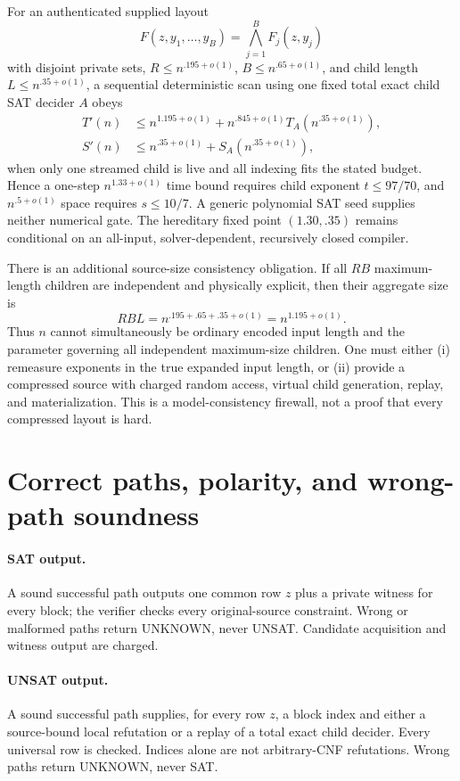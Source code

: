 \documentclass[11pt]{article}
\newcommand{\UNKNOWN}{\mathrm{UNKNOWN}}
\begin{document}
For an authenticated supplied layout
\[
 F(z,y_1,\ldots,y_B)=\bigwedge_{j=1}^B F_j(z,y_j)
\]
with disjoint private sets, $R\le n^{.195+o(1)}$, $B\le n^{.65+o(1)}$, and child length $L\le n^{.35+o(1)}$, a sequential deterministic scan using one fixed total exact child SAT decider $A$ obeys
\begin{align*}
 T'(n)&\le n^{1.195+o(1)}+n^{.845+o(1)}T_A(n^{.35+o(1)}),\\
 S'(n)&\le n^{.35+o(1)}+S_A(n^{.35+o(1)}),
\end{align*}
when only one streamed child is live and all indexing fits the stated budget.  Hence a one-step $n^{1.33+o(1)}$ time bound requires child exponent $t\le97/70$, and $n^{.5+o(1)}$ space requires $s\le10/7$.  A generic polynomial SAT seed supplies neither numerical gate.  The hereditary fixed point $(1.30,.35)$ remains conditional on an all-input, solver-dependent, recursively closed compiler.

There is an additional source-size consistency obligation.  If all $RB$ maximum-length children are independent and physically explicit, then their aggregate size is
\[
 RBL=n^{.195+.65+.35+o(1)}=n^{1.195+o(1)}.
\]
Thus $n$ cannot simultaneously be ordinary encoded input length and the parameter governing all independent maximum-size children.  One must either (i) remeasure exponents in the true expanded input length, or (ii) provide a compressed source with charged random access, virtual child generation, replay, and materialization.  This is a model-consistency firewall, not a proof that every compressed layout is hard.

\section{Correct paths, polarity, and wrong-path soundness}

\paragraph{SAT output.}
A sound successful path outputs one common row $z$ plus a private witness for every block; the verifier checks every original-source constraint.  Wrong or malformed paths return $\UNKNOWN$, never UNSAT.  Candidate acquisition and witness output are charged.

\paragraph{UNSAT output.}
A sound successful path supplies, for every row $z$, a block index and either a source-bound local refutation or a replay of a total exact child decider.  Every universal row is checked.  Indices alone are not arbitrary-CNF refutations.  Wrong paths return $\UNKNOWN$, never SAT.
\end{document}

